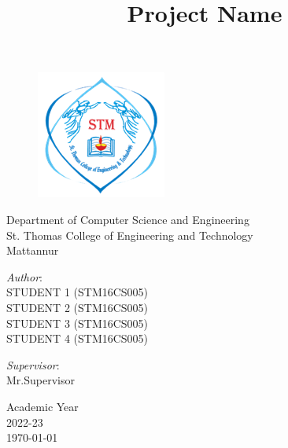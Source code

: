 \documentclass[svgnames,9pt]{beamer}
\title[Short title]{\huge \textbf{Project Name}  } %
\author[Group1]{}
\date{}
\begin{document}
	\begin{frame}
		
		\begin{figure}[h!]
			\includegraphics[scale=0.5]{img/stthomaskannur.png}
		\end{figure}
		
		\begin{center}      
			\begin{minipage}[b]{1.0\textwidth}
				\centering
				Department of Computer Science and Engineering\\
				St. Thomas College of Engineering and Technology\\Mattannur
			\end{minipage}%
		\end{center}
		
		\titlepage
		
		\begin{minipage}[t]{0.5\textwidth}
			\vspace{-2cm}
			\begin{flushleft}
				{ \textit{Author}:\vspace*{0.1cm} \\STUDENT 1 (STM16CS005)\\STUDENT 2 (STM16CS005)\\STUDENT 3 (STM16CS005)\\STUDENT 4 (STM16CS005) } %
			\end{flushleft}
		\end{minipage}%
		\begin{minipage}[t]{0.5\textwidth}
			\vspace{-2cm}
			\begin{flushright}
				{\textit{Supervisor}:\vspace*{0.1cm} \\ Mr.Supervisor} %
			\end{flushright}    
		\end{minipage}%
		
		\vspace{-0.7cm}
		\begin{center}      
			\begin{minipage}[b]{0.5\textwidth}
				\centering  
				\small Academic Year \\ 2022-23\\ \today
			\end{minipage}%
		\end{center}    
	\end{frame}
\end{document}
